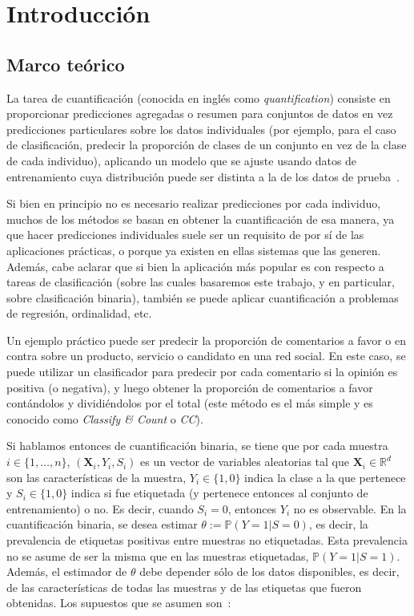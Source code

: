 \chapter{Introducción}\label{introduccion}

\section{Marco teórico}\label{introduccion:marco_teorico}

La tarea de cuantificación (conocida en inglés como {\it quantification\/})
consiste en proporcionar predicciones agregadas o resumen para conjuntos de
datos en vez predicciones particulares sobre los datos individuales (por
ejemplo, para el caso de clasificación, predecir la proporción de clases de un
conjunto en vez de la clase de cada individuo), aplicando un modelo que se
ajuste usando datos de entrenamiento cuya distribución puede ser distinta a la
de los datos de prueba~\cite{forman2005counting}.

Si bien en principio no es necesario realizar predicciones por cada individuo,
muchos de los métodos se basan en obtener la cuantificación de esa manera, ya
que hacer predicciones individuales suele ser un requisito de por sí de las
aplicaciones prácticas, o porque ya existen en ellas sistemas que las generen.
Además, cabe aclarar que si bien la aplicación más popular es con respecto a
tareas de clasificación (sobre las cuales basaremos este trabajo, y en
particular, sobre clasificación binaria), también se puede aplicar
cuantificación a problemas de regresión, ordinalidad, etc.

Un ejemplo práctico puede ser predecir la proporción de comentarios a favor o en
contra sobre un producto, servicio o candidato en una red social. En este caso,
se puede utilizar un clasificador para predecir por cada comentario si la
opinión es positiva (o negativa), y luego obtener la proporción de comentarios a
favor contándolos y dividiéndolos por el total (este método es el más simple y
es conocido como {\it Classify \& Count\/} o {\it CC\/}).

Si hablamos entonces de cuantificación binaria, se tiene que por cada muestra $i
\in \{1,\dots,n\}$, $(\mathbf{X}_i,Y_i,S_i)$ es un vector de variables
aleatorias tal que $\mathbf{X}_i \in \mathbb{R}^d$ son las características de la
muestra, $Y_i \in \{1,0\}$ indica la clase a la que pertenece y $S_i \in
\{1,0\}$ indica si fue etiquetada (y pertenece entonces al conjunto de
entrenamiento) o no. Es decir, cuando $S_i=0$, entonces $Y_i$ no es observable.
En la cuantificación binaria, se desea estimar $\theta:= \mathbb{P}(Y=1|S=0)$,
es decir, la prevalencia de etiquetas positivas entre muestras no etiquetadas.
Esta prevalencia no se asume de ser la misma que en las muestras etiquetadas,
$\mathbb{P}(Y=1|S=1)$. Además, el estimador de $\theta$ debe depender sólo de
los datos disponibles, es decir, de las características de todas las muestras y
de las etiquetas que fueron obtenidas. Los supuestos que se asumen
son~\cite{vaz2019quantification}:

